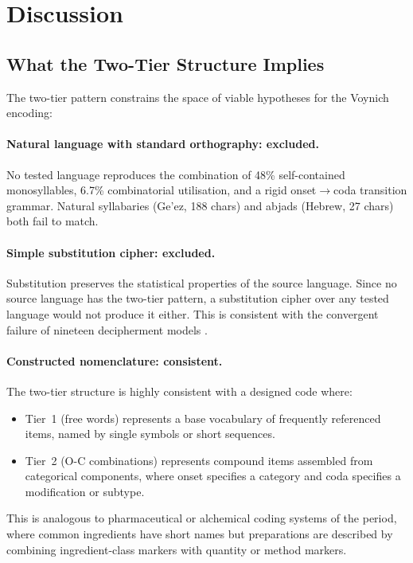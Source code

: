 \section{Discussion}
\label{sec:discussion}

\subsection{What the Two-Tier Structure Implies}

The two-tier pattern constrains the space of viable hypotheses for the Voynich encoding:

\paragraph{Natural language with standard orthography: excluded.}
No tested language reproduces the combination of 48\% self-contained monosyllables, 6.7\% combinatorial utilisation, and a rigid onset$\to$coda transition grammar.  Natural syllabaries (Ge'ez, 188 chars) and abjads (Hebrew, 27 chars) both fail to match.

\paragraph{Simple substitution cipher: excluded.}
Substitution preserves the statistical properties of the source language.  Since no source language has the two-tier pattern, a substitution cipher over any tested language would not produce it either.  This is consistent with the convergent failure of nineteen decipherment models \citep{jimenez2026}.

\paragraph{Constructed nomenclature: consistent.}
The two-tier structure is highly consistent with a designed code where:
\begin{itemize}[nosep]
  \item Tier~1 (free words) represents a base vocabulary of frequently referenced items, named by single symbols or short sequences.
  \item Tier~2 (O-C combinations) represents compound items assembled from categorical components, where onset specifies a category and coda specifies a modification or subtype.
\end{itemize}

This is analogous to pharmaceutical or alchemical coding systems of the period, where common ingredients have short names but preparations are described by combining ingredient-class markers with quantity or method markers.

